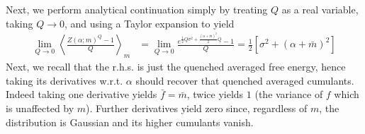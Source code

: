 Next, we perform analytical continuation simply by treating $Q$ as a real variable, taking $Q
\rightarrow 0$, and using a Taylor expansion to yield 
\begin{align}
\lim_{Q \rightarrow 0} \left \langle \frac{Z(\alpha;m)^Q - 1}{Q}
\right \rangle_{m}  &= \lim_{Q \rightarrow 0}  \frac{e^{\frac{1}{2} Q\sigma^2+\frac{(\alpha+\bar{m})^2}{2}Q}-1}{Q} = \frac{1}{2}[\sigma^2+(\alpha+\bar{m})^2]
\end{align}
Next, we recall that the r.h.s. is just the quenched averaged free energy, hence taking its derivatives w.r.t. $\alpha$ should recover that quenched averaged cumulants. Indeed taking one derivative yields $\bar{f}=\bar{m}$, twice yields $1$ (the variance of $f$ which is unaffected by $m$). Further derivatives yield zero since, regardless of $m$, the distribution is Gaussian and its higher cumulants vanish. 
